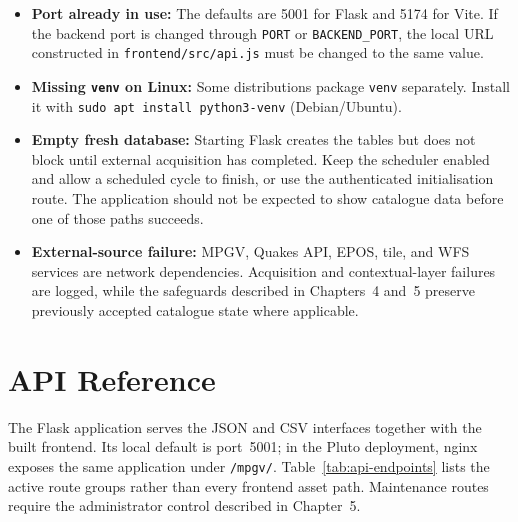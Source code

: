 \documentclass[12pt]{article}
\begin{document}
\begin{itemize}
    \item \textbf{Port already in use:} The defaults are 5001 for Flask and 5174 for Vite. If the backend port is changed through \texttt{PORT} or \texttt{BACKEND\_PORT}, the local URL constructed in \texttt{frontend/src/api.js} must be changed to the same value.
    \item \textbf{Missing \texttt{venv} on Linux:} Some distributions package \texttt{venv} separately. Install it with \texttt{sudo apt install python3-venv} (Debian/Ubuntu).
    \item \textbf{Empty fresh database:} Starting Flask creates the tables but does not block until external acquisition has completed. Keep the scheduler enabled and allow a scheduled cycle to finish, or use the authenticated initialisation route. The application should not be expected to show catalogue data before one of those paths succeeds.
    \item \textbf{External-source failure:} MPGV, Quakes API, EPOS, tile, and WFS services are network dependencies. Acquisition and contextual-layer failures are logged, while the safeguards described in Chapters~4 and~5 preserve previously accepted catalogue state where applicable.
\end{itemize}

\clearpage
\section{API Reference}
\label{app:api}

The Flask application serves the JSON and CSV interfaces together with the built frontend. Its local default is port~5001; in the Pluto deployment, nginx exposes the same application under \texttt{/mpgv/}. Table~\ref{tab:api-endpoints} lists the active route groups rather than every frontend asset path. Maintenance routes require the administrator control described in Chapter~5.
\end{document}
